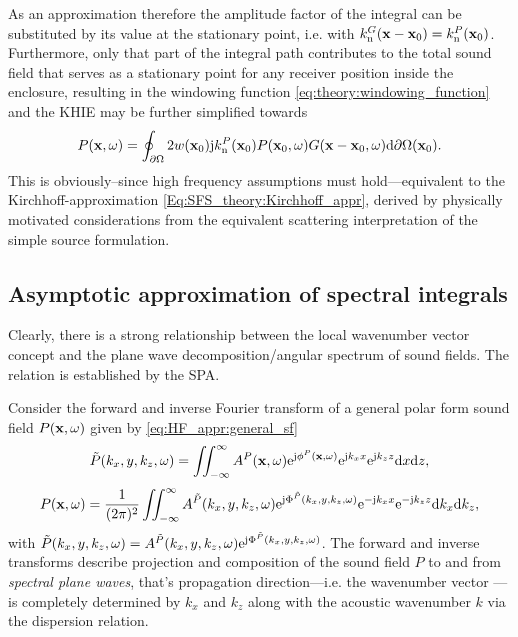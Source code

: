 As an approximation therefore the amplitude factor of the integral can be substituted by its value at the stationary point, i.e. with $k_{\mathrm{n}}^G(\mathbf{x}-\mathbf{x}_0) = k_{\mathrm{n}}^P(\mathbf{x}_0)$.
Furthermore, only that part of the integral path contributes to the total sound field that serves as a stationary point for any receiver position inside the enclosure,
resulting in the windowing function \eqref{eq:theory:windowing_function} and the KHIE may be further simplified towards
\begin{equation}
P(\mathbf{x},\omega) = 
\oint_{\partial \Omega} 
2 w(\mathbf{x}_0) \mathrm{j} k_{\mathrm{n}}^P(\mathbf{x}_0) 
P(\mathbf{x}_0,\omega) G(\mathbf{x}-\mathbf{x}_0,\omega)  \mathrm{d} \partial \Omega( \mathbf{x}_0).
\label{Eq:HF_appr:Kirchhoff_approximation}
\end{equation}
This is obviously--since high frequency assumptions must hold---equivalent to the Kirchhoff-approximation \eqref{Eq:SFS_theory:Kirchhoff_appr}, derived by physically motivated considerations from the equivalent scattering interpretation of the simple source formulation.

\subsection{Asymptotic approximation of spectral integrals}
\label{Sec:SPA_for_Fourier}
Clearly, there is a strong relationship between the local wavenumber vector concept and the plane wave decomposition/angular spectrum of sound fields.
The relation is established by the SPA.

Consider the forward and inverse Fourier transform of a general polar form sound field $P(\mathbf{x},\omega)$ given by \eqref{eq:HF_appr:general_sf}
\begin{equation}
\tilde{P}(k_x,y,k_z,\omega) = \iint_{-\infty}^{\infty} A^P(\mathbf{x},\omega)\mathrm{e}^{\mathrm{j} \phi^P(\mathbf{x},\omega)} \mathrm{e}^{\mathrm{j} k_x x} \mathrm{e}^{\mathrm{j} k_z z} \mathrm{d} x \mathrm{d} z,
\label{eq:forward_transform}
\end{equation}
\begin{equation}
P(\mathbf{x},\omega) = \frac{1}{(2\pi)^2} \iint_{-\infty}^{\infty} A^{\tilde{P}}(k_x,y,k_z,\omega)\mathrm{e}^{\mathrm{j} \Phi^{\tilde{P}}(k_x,y,k_z,\omega)}  \mathrm{e}^{-\mathrm{j} k_x x} \mathrm{e}^{-\mathrm{j} k_z z} \mathrm{d} k_x \mathrm{d} k_z,
\label{eq:inverse_transform}
\end{equation}
with $\tilde{P}(k_x,y,k_z,\omega) = A^{\tilde{P}}(k_x,y,k_z,\omega)\mathrm{e}^{\mathrm{j} \Phi^{\tilde{P}}(k_x,y,k_z,\omega)}$.
The forward and inverse transforms describe projection and composition of the sound field $P$ to and from \emph{spectral plane waves}, that's propagation direction---i.e. the wavenumber vector ---is completely determined by $k_x$ and $k_z$ along with the acoustic wavenumber $k$ via the dispersion relation.

